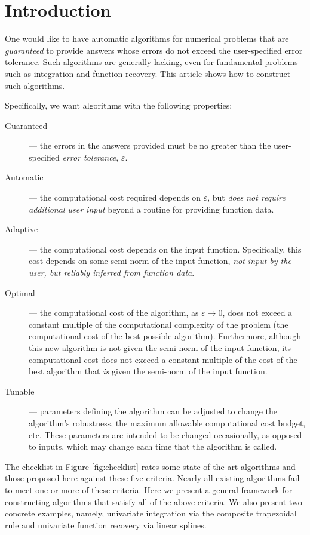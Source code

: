\documentclass[]{elsarticle}
\theoremstyle{definition}
\theoremstyle{remark}
\begin{document}
\section{Introduction}

One would like to have automatic algorithms for numerical problems that are \emph{guaranteed} to provide answers whose errors do not exceed the user-specified error tolerance.  Such algorithms are generally lacking, even for fundamental problems such as integration and function recovery.  This article shows how to construct such algorithms. 

Specifically, we want algorithms with the following properties:
\begin{description}
\item[Guaranteed]--- the errors in the answers provided must be no greater than the user-specified \emph{error tolerance}, $\varepsilon$.
\item[Automatic]--- the computational cost required depends on $\varepsilon$, but \emph{does not require additional user input} beyond a routine for providing function data.
\item[Adaptive]--- the computational cost depends on the input function.  Specifically, this cost depends on some semi-norm of the input function, \emph{not input by the user, but reliably inferred from function data}.
\item[Optimal]--- the computational cost of the algorithm, as $\varepsilon \to 0$, does not exceed a constant multiple of the computational complexity of the problem (the computational cost of the best possible algorithm).  Furthermore, although this new algorithm is not given the semi-norm of the input function, its computational cost does not exceed a constant multiple of the cost of the best algorithm that \emph{is} given the semi-norm of the input function.
\item[Tunable]--- parameters defining the algorithm can be adjusted to change the algorithm's robustness, the maximum allowable computational cost budget, etc.  These parameters are intended to be changed occasionally, as opposed to inputs, which may change each time that the algorithm is called.
\end{description}
The checklist in Figure \ref{fig:checklist} rates some state-of-the-art algorithms and those proposed here against these five criteria.  Nearly all existing algorithms fail to meet one or more of these criteria.  Here we present a general framework for constructing algorithms that satisfy all of the above criteria.  We also present two concrete examples, namely, univariate integration via the composite trapezoidal rule and univariate function recovery via linear splines.
\end{document}
